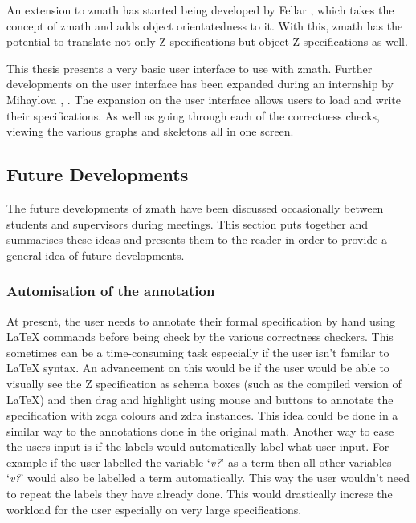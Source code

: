 An extension to \gls{zmath} has started being developed by Fellar \cite{zmathmaster}, \cite{ozmathconference} which takes the concept of \gls{zmath} and adds object orientatedness to it. With this, \gls{zmath} has the potential to translate not only Z specifications but object-Z specifications as well. 

This thesis presents a very basic user interface to use with \gls{zmath}. Further developments on the user interface has been expanded during an internship by Mihaylova \cite{zmathuser}, \cite{zmathinternship}. The expansion on the user interface allows users to load and write their specifications. As well as going through each of the correctness checks, viewing the various graphs and skeletons all in one screen.

\subsection{Future Developments}
\label{subsec:futuredevelopments}

The future developments of \gls{zmath} have been discussed occasionally between students and supervisors during meetings. This section puts together and summarises these ideas and presents them to the reader in order to provide a general idea of future developments.

\subsubsection{Automisation of the annotation}

At present, the user needs to annotate their formal specification by hand using \LaTeX{} commands before being check by the various correctness checkers. This sometimes can be a time-consuming task especially if the user isn't familar to \LaTeX{} syntax. An advancement on this would be if the user would be able to visually see the Z specification as schema boxes (such as the compiled version of \LaTeX{}) and then drag and highlight using mouse and buttons to annotate the specification with \gls{zcga} colours and \gls{zdra} instances. This idea could be done in a similar way to the annotations done in the original \gls{math}. Another way to ease the users input is if the labels would automatically label what user input. For example if the user labelled the variable `\emph{v?}' as a term then all other variables `\emph{v?}' would also be labelled a term automatically. This way the user wouldn't need to repeat the labels they have already done. This would drastically increse the workload for the user especially on very large specifications.

